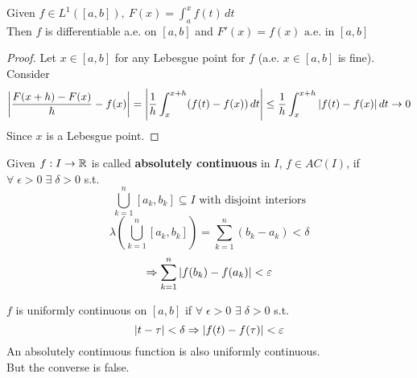 \begin{theorem}
Given \(f \in L^1([a,b]),\ F(x) = \int_a^xf(t) \, dt\) \\
Then \(f\) is differentiable a.e. on \([a,b]\) and \(F'(x) = f(x) \text{ a.e. in } [a,b]\)    
\end{theorem}
\begin{proof}
    Let \(x \in [a,b]\) for any Lebesgue point for \(f\) (a.e. \(x \in [a,b]\) is fine). Consider
    \[
        \left|{\frac{F(x+h)-F(x)}{h} - f(x)}\right| = \abs{\frac{1}{h} \int_x^{x+h} (f(t) - f(x)) \,dt } \leq \frac{1}{h} \int_x^{x+h} |f(t) - f(x)| \,dt \to 0 
    \]
    Since \(x\) is a Lebesgue point.
\end{proof}
\begin{definition}
    Given \(f : I \to \mathbb{R}\) is called \textbf{absolutely continuous} in \(I\), \(f \in AC(I)\), if \(\forall \; \epsilon >0 \; \exists \; \delta >0\)  
    s.t. 
    \[
        \bigcup_{k=1}^n [a_k, b_k] \subseteq I \text{ with disjoint interiors}
    \] 
    \[
        \lambda(\bigcup_{k=1}^n [a_k, b_k]) = \sum_{k=1}^n (b_k -a_k) < \delta
    \]
    \[
        \Rightarrow \sum_{k=1}^n \abs{f(b_k)-f(a_k)} < \varepsilon
    \]
\end{definition}
\begin{remark}
    \(f\) is uniformly continuous on \([a,b]\) if \(\forall \; \epsilon > 0\) \(\exists \; \delta > 0\) s.t. 
    \[
        \abs{t - \tau} < \delta \Rightarrow \abs{f(t)-f(\tau)} < \varepsilon
    \]
    An absolutely continuous function is also uniformly continuous. \\
    But the converse is false.
\end{remark}

